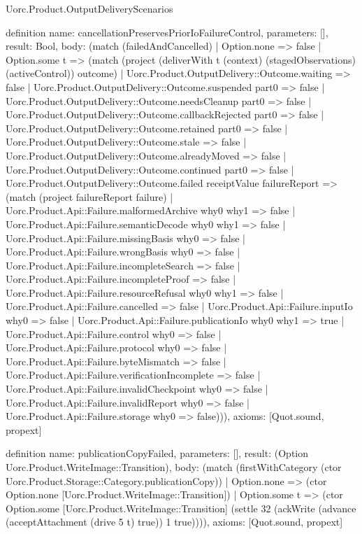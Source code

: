 \begin{lexlean}{Uorc.Product.OutputDeliveryScenarios}
\begin{semanticmodule}
definition{
  name: cancellationPreservesPriorIoFailureControl,
  parameters: [],
  result: Bool,
  body: (match (failedAndCancelled)
    | Option.none => false
    | Option.some t => (match (project (deliverWith t (context) (stagedObservations) (activeControl)) outcome)
      | Uorc.Product.OutputDelivery::Outcome.waiting => false
      | Uorc.Product.OutputDelivery::Outcome.suspended part0 => false
      | Uorc.Product.OutputDelivery::Outcome.needsCleanup part0 => false
      | Uorc.Product.OutputDelivery::Outcome.callbackRejected part0 => false
      | Uorc.Product.OutputDelivery::Outcome.retained part0 => false
      | Uorc.Product.OutputDelivery::Outcome.stale => false
      | Uorc.Product.OutputDelivery::Outcome.alreadyMoved => false
      | Uorc.Product.OutputDelivery::Outcome.continued part0 => false
      | Uorc.Product.OutputDelivery::Outcome.failed receiptValue failureReport => (match (project failureReport failure)
        | Uorc.Product.Api::Failure.malformedArchive why0 why1 => false
        | Uorc.Product.Api::Failure.semanticDecode why0 why1 => false
        | Uorc.Product.Api::Failure.missingBasis why0 => false
        | Uorc.Product.Api::Failure.wrongBasis why0 => false
        | Uorc.Product.Api::Failure.incompleteSearch => false
        | Uorc.Product.Api::Failure.incompleteProof => false
        | Uorc.Product.Api::Failure.resourceRefusal why0 why1 => false
        | Uorc.Product.Api::Failure.cancelled => false
        | Uorc.Product.Api::Failure.inputIo why0 => false
        | Uorc.Product.Api::Failure.publicationIo why0 why1 => true
        | Uorc.Product.Api::Failure.control why0 => false
        | Uorc.Product.Api::Failure.protocol why0 => false
        | Uorc.Product.Api::Failure.byteMismatch => false
        | Uorc.Product.Api::Failure.verificationIncomplete => false
        | Uorc.Product.Api::Failure.invalidCheckpoint why0 => false
        | Uorc.Product.Api::Failure.invalidReport why0 => false
        | Uorc.Product.Api::Failure.storage why0 => false))),
  axioms: [Quot.sound, propext]
}

definition{
  name: publicationCopyFailed,
  parameters: [],
  result: (Option Uorc.Product.WriteImage::Transition),
  body: (match (firstWithCategory (ctor Uorc.Product.Storage::Category.publicationCopy))
    | Option.none => (ctor Option.none [Uorc.Product.WriteImage::Transition])
    | Option.some t => (ctor Option.some [Uorc.Product.WriteImage::Transition] (settle 32 (ackWrite (advance (acceptAttachment (drive 5 t) true)) 1 true)))),
  axioms: [Quot.sound, propext]
}


\end{semanticmodule}
\end{lexlean}
